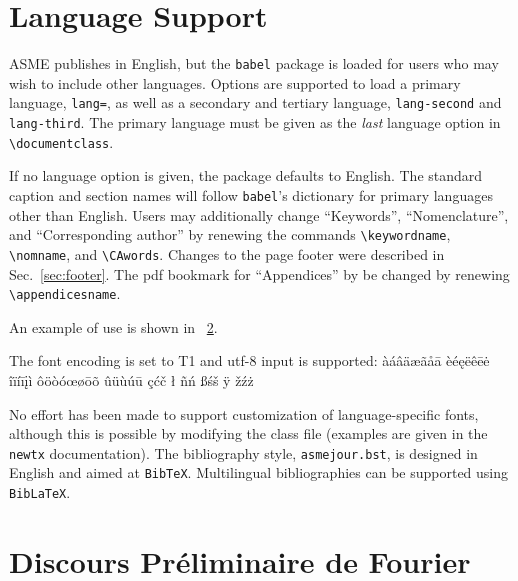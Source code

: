 \documentclass[largesc,upint,varvw,barcolor=Red4,nocopyright,hyphenate,balance,lang-second=french,lang=english]{asmejour}
\begin{document}
\section{Language Support}

ASME publishes in English, but the \texttt{babel} package is loaded for 
users who may wish to include other languages. Options are supported to load a primary language, \texttt{lang=}, as well
as a secondary and tertiary language, \texttt{lang-second} and \texttt{lang-third}.  The primary language must be given as the \textit{last} language option in  \verb|\documentclass|.  

If no language option is given, the package defaults to English. The standard caption and section names will follow \texttt{babel}'s dictionary for primary languages other than English.  Users may additionally change ``Keywords'', ``Nomenclature'', and  ``Corresponding author'' by renewing the commands \verb|\keywordname|, \verb|\nomname|, and \verb|\CAwords|. Changes to the page footer were described in Sec.~\ref{sec:footer}. The pdf bookmark for ``Appendices'' by be changed by renewing \verb|\appendicesname|.

An example of use is shown in \appendixname\ \ref{app:fourier}.

The font encoding is set to T1 and utf-8 input is supported:
àáâäæãåā  èéęëêēė  îïíīįì ôöòóœøōõ ûüùúū çćč ł ñń ßśš ÿ žźż
 
No effort has been made to support customization of language-specific fonts, although this is possible by modifying the class file (examples are given in the \texttt{newtx} documentation). The bibliography style, \texttt{asmejour.bst}, is designed in English and aimed at \texttt{BibTeX}.  Multilingual bibliographies can be supported using \texttt{BibLaTeX}.

\section{Discours Préliminaire de Fourier}\label{app:fourier}
\end{document}
